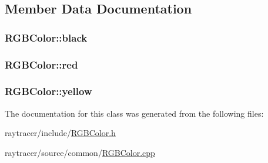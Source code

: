 \subsection{Member Data Documentation}
\hypertarget{class_r_g_b_color_a39194ee333c3c6b2b499f7c320025c34}{
\subsubsection[{black}]{ R\-G\-B\-Color\-::black\hspace{0.3cm}{\ttfamily [static]}}}\label{class_r_g_b_color_a39194ee333c3c6b2b499f7c320025c34}
\hypertarget{class_r_g_b_color_abf657524d06ec0fdb58568a548f12f8b}{
\subsubsection[{red}]{ R\-G\-B\-Color\-::red\hspace{0.3cm}{\ttfamily [static]}}}\label{class_r_g_b_color_abf657524d06ec0fdb58568a548f12f8b}
\hypertarget{class_r_g_b_color_a850de47dd0a7df77ca32a0b5cc6703b7}{
\subsubsection[{yellow}]{ R\-G\-B\-Color\-::yellow\hspace{0.3cm}{\ttfamily [static]}}}\label{class_r_g_b_color_a850de47dd0a7df77ca32a0b5cc6703b7}


The documentation for this class was generated from the following files\-:\begin{DoxyCompactItemize}
\item 
raytracer/include/\hyperlink{_r_g_b_color_8h}{R\-G\-B\-Color.\-h}\item 
raytracer/source/common/\hyperlink{_r_g_b_color_8cpp}{R\-G\-B\-Color.\-cpp}\end{DoxyCompactItemize}
